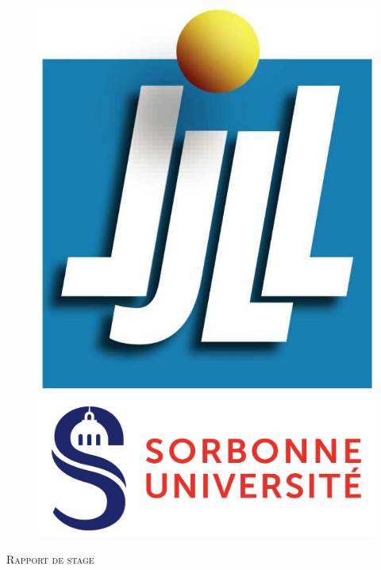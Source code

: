 \documentclass[ 
11pt, %
french, %
singlespacing, %
parskip, %
headsepline, %
openany, %
]{MastersDoctoralThesis} %
\theoremstyle{plain}
\numberwithin{theorem}{section}  %
\begin{document}
\begin{titlepage}
\begin{figure}[!htb]
\begin{minipage}{0.24\textwidth}
     \includegraphics[width=.6\linewidth]{LogoLJLL.jpg}
   \end{minipage}
   \begin{minipage}{0.24\textwidth}
    \centering
    \includegraphics[width=.99\linewidth]{LogoSorbonne.png}
  \end{minipage}
\end{figure}


\begin{center}

\vspace*{.04\textheight}
\textsc{\Large Rapport de stage}\\[0.5cm] %

\HRule \\[0.4cm] %
{\huge \bfseries \ttitle\par}\vspace{0.4cm} %
\HRule \\[1.5cm] %


\end{center}
\end{titlepage}
\end{document}
